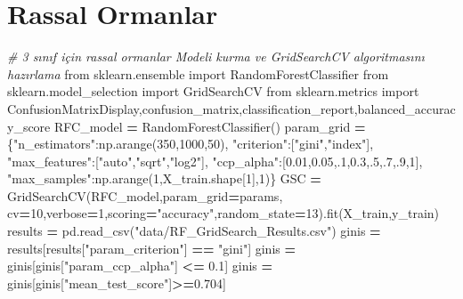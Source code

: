 \documentclass[12pt,twoside]{deuthesis}
\newenvironment{Shaded}{\begin{snugshade}}{\end{snugshade}}
\newcommand{\CommentTok}[1]{\textcolor[rgb]{0.56,0.35,0.01}{\textit{#1}}}
\newcommand{\DecValTok}[1]{\textcolor[rgb]{0.00,0.00,0.81}{#1}}
\newcommand{\FloatTok}[1]{\textcolor[rgb]{0.00,0.00,0.81}{#1}}
\newcommand{\ImportTok}[1]{#1}
\newcommand{\NormalTok}[1]{#1}
\newcommand{\OperatorTok}[1]{\textcolor[rgb]{0.81,0.36,0.00}{\textbf{#1}}}
\newcommand{\StringTok}[1]{\textcolor[rgb]{0.31,0.60,0.02}{#1}}
\begin{document}
\hypertarget{rassal-ormanlar}{%
\section{Rassal Ormanlar}\label{rassal-ormanlar}}
\begin{Shaded}
\begin{Highlighting}[]
\CommentTok{\# 3 sınıf için rassal ormanlar Modeli kurma ve GridSearchCV algoritmasını hazırlama}
\ImportTok{from}\NormalTok{ sklearn.ensemble }\ImportTok{import}\NormalTok{ RandomForestClassifier}
\ImportTok{from}\NormalTok{ sklearn.model\_selection }\ImportTok{import}\NormalTok{ GridSearchCV}
\ImportTok{from}\NormalTok{ sklearn.metrics }\ImportTok{import}\NormalTok{ ConfusionMatrixDisplay,confusion\_matrix,classification\_report,balanced\_accuracy\_score}
\NormalTok{RFC\_model }\OperatorTok{=}\NormalTok{ RandomForestClassifier()}
\NormalTok{param\_grid }\OperatorTok{=}\NormalTok{ \{}\StringTok{"n\_estimators"}\NormalTok{:np.arange(}\DecValTok{350}\NormalTok{,}\DecValTok{1000}\NormalTok{,}\DecValTok{50}\NormalTok{),}
              \StringTok{"criterion"}\NormalTok{:[}\StringTok{"gini"}\NormalTok{,}\StringTok{"index"}\NormalTok{],}
              \StringTok{"max\_features"}\NormalTok{:[}\StringTok{"auto"}\NormalTok{,}\StringTok{"sqrt"}\NormalTok{,}\StringTok{"log2"}\NormalTok{],}
              \StringTok{"ccp\_alpha"}\NormalTok{:[}\FloatTok{0.01}\NormalTok{,}\FloatTok{0.05}\NormalTok{,}\FloatTok{.1}\NormalTok{,}\FloatTok{0.3}\NormalTok{,}\FloatTok{.5}\NormalTok{,}\FloatTok{.7}\NormalTok{,}\FloatTok{.9}\NormalTok{,}\DecValTok{1}\NormalTok{],}
              \StringTok{"max\_samples"}\NormalTok{:np.arange(}\DecValTok{1}\NormalTok{,X\_train.shape[}\DecValTok{1}\NormalTok{],}\DecValTok{1}\NormalTok{)\}}
\NormalTok{GSC }\OperatorTok{=}\NormalTok{ GridSearchCV(RFC\_model,param\_grid}\OperatorTok{=}\NormalTok{params,}
\NormalTok{                   cv}\OperatorTok{=}\DecValTok{10}\NormalTok{,verbose}\OperatorTok{=}\DecValTok{1}\NormalTok{,scoring}\OperatorTok{=}\StringTok{"accuracy"}\NormalTok{,random\_state}\OperatorTok{=}\DecValTok{13}\NormalTok{).fit(X\_train,y\_train)}
\NormalTok{results }\OperatorTok{=}\NormalTok{ pd.read\_csv(}\StringTok{"data/RF\_GridSearch\_Results.csv"}\NormalTok{)}
\NormalTok{ginis }\OperatorTok{=}\NormalTok{ results[results[}\StringTok{"param\_criterion"}\NormalTok{] }\OperatorTok{==} \StringTok{"gini"}\NormalTok{]}
\NormalTok{ginis }\OperatorTok{=}\NormalTok{ ginis[ginis[}\StringTok{"param\_ccp\_alpha"}\NormalTok{] }\OperatorTok{\textless{}=} \FloatTok{0.1}\NormalTok{]}
\NormalTok{ginis }\OperatorTok{=}\NormalTok{ ginis[ginis[}\StringTok{"mean\_test\_score"}\NormalTok{]}\OperatorTok{\textgreater{}=}\FloatTok{0.704}\NormalTok{]}

\end{Highlighting}
\end{Shaded}
\end{document}
